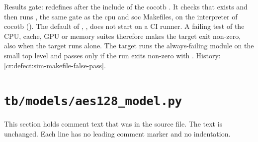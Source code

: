 \begin{information}
Results gate:  redefines  after the include of the cocotb . It checks that  exists and then runs , the same gate as the cpu and soc Makefiles, on the interpreter of cocotb (). The default of , , does not start on a CI runner. A failing test of the CPU, cache, GPU or memory suites therefore makes the target exit non-zero, also when the target runs alone. The target  runs the always-failing module  on the small top level  and passes only if the run exits non-zero with . History: \cref{cr:defect:sim-makefile-false-pass}.
\end{information}

\section{\texttt{tb/models/aes128\_model.py}}\label{tm:suite:aes128-model}

This section holds comment text that was in the source file. The text is unchanged. Each line has no leading comment marker and no indentation.

